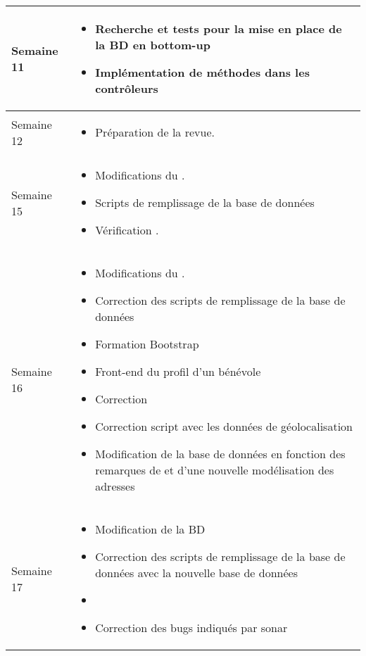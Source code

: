 \documentclass [a4paper] {article}
\begin{document}
\begin{longtable}{|>{\columncolor{gray!40}}p{2cm}|p{12cm}|}
	Semaine 11 & \begin{itemize}
		\item Recherche et tests pour la mise en place de la BD en bottom-up
		\item Implémentation de méthodes dans les contrôleurs
		\end{itemize} \\
	\hline
	Semaine 12 & \begin{itemize}
	\item Préparation de la revue.
	\end{itemize} \\
	\hline
	
	Semaine 15 & \begin{itemize}
	\item Modifications du \PGCCourt .
	\item Scripts de remplissage de la base de données
	\item Vérification \CRTPCourt.
	\end{itemize} \\
	\hline
	
	Semaine 16 & \begin{itemize}
	\item Modifications du \PGCCourt .
	\item Correction des scripts de remplissage de la base de données
	\item Formation Bootstrap
	\item Front-end du profil d'un bénévole
	\item Correction \CRTP
	\item Correction script avec les données de géolocalisation
	\item Modification de la base de données en fonction des remarques de \nomTuteurPedago et d'une nouvelle modélisation des adresses
	\end{itemize} \\
	\hline

	Semaine 17 & \begin{itemize}
	\item Modification de la BD
	\item Correction des scripts de remplissage de la base de données avec la nouvelle base de données
	\item \CTFT
	\item Correction des bugs indiqués par sonar
	\end{itemize} \\
	\hline



\end{longtable}
\end{document}
